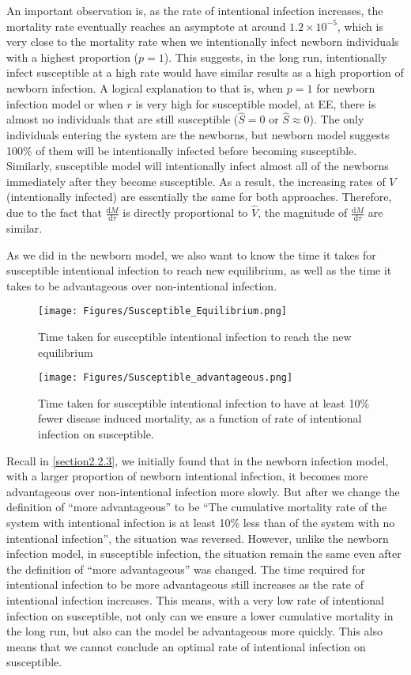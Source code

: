 \documentclass[12pt]{article}
\newcommand\dbyd[2]{\frac{\mathrm d{#1}}{\mathrm d{#2}}}
\begin{document}
An important observation is, as the rate of intentional infection increases, the mortality rate eventually reaches an asymptote at around $1.2\times10^{-5}$, which is very close to the mortality rate when we intentionally infect newborn individuals with a highest proportion ($p=1$). This suggests, in the long run, intentionally infect susceptible at a high rate would have similar results as a high proportion of newborn infection. A logical explanation to that is, when $p=1$ for newborn infection model or when $r$ is very high for susceptible model, at EE, there is almost no individuals that are still susceptible ($\hat{S}=0$ or $\hat{S}\approx0$). The only individuals entering the system are the newborns, but newborn model suggests 100\% of them will be intentionally infected before becoming susceptible. Similarly, susceptible model will intentionally infect almost all of the newborns immediately after they become susceptible. As a result, the increasing rates of $V$ (intentionally infected) are essentially the same for both approaches. Therefore, due to the fact that $\dbyd{M}{\tau}$ is directly proportional to $\hat{V}$, the magnitude of $\dbyd{M}{\tau}$ are similar.


As we did in the newborn model, we also want to know the time it takes for susceptible intentional infection to reach new equilibrium, as well as the time it takes to be advantageous over non-intentional infection.

\begin{figure}[H]
  \centering
  \texttt{[image: Figures/Susceptible\_Equilibrium.png]}
  \caption{Time taken for susceptible intentional infection to reach the new equilibrium}
\end{figure}

\begin{figure}[H]
  \centering
  \texttt{[image: Figures/Susceptible\_advantageous.png]}
  \caption{Time taken for susceptible intentional infection to have at least 10$\%$ fewer disease induced mortality, as a function of rate of intentional infection on susceptible.}
\end{figure}

Recall in \autoref{section2.2.3}, we initially found that in the newborn infection model, with a larger proportion of newborn intentional infection, it becomes more advantageous over non-intentional infection more slowly. But after we change the definition of ``more advantageous'' to be ``The cumulative mortality rate of the system with intentional infection is at least 10\% less than of the system with no intentional infection'', the situation was reversed. However, unlike the newborn infection model, in susceptible infection, the situation remain the same even after the definition of ``more advantageous'' was changed. The time required for intentional infection to be more advantageous still increases as the rate of intentional infection increases. This means, with a very low rate of intentional infection on susceptible, not only can we ensure a lower cumulative mortality in the long run, but also can the model be advantageous more quickly. This also means that we cannot conclude an optimal rate of intentional infection on susceptible.
\end{document}
